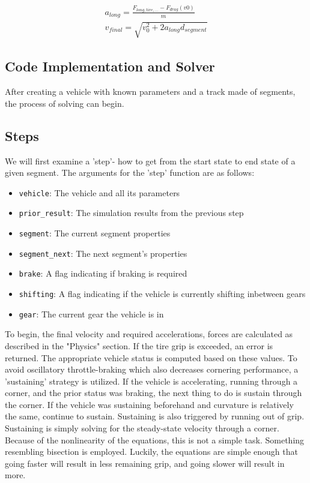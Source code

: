 \documentclass{article}
\begin{document}
\begin{align}
	a_{long} = \frac{F_{long,tire,...} - F_{drag}(v0)}{m} \\
	v_{final} = \sqrt{v_0^2 + 2 a_{long} d_{segment}}
\end{align}


\subsection{Code Implementation and Solver}

After creating a vehicle with known parameters and a track made of segments, the process of solving can begin. 

\subsection{Steps}

We will first examine a 'step'- how to get from the start state to end state of a given segment. The arguments for the 'step' function are as follows:

\begin{itemize}
\item \texttt{vehicle}: The vehicle and all its parameters
\item \texttt{prior\_result}: The simulation results from the previous step
\item \texttt{segment}: The current segment properties
\item \texttt{segment\_next}: The next segment's properties
\item \texttt{brake}: A flag indicating if braking is required
\item \texttt{shifting}: A flag indicating if the vehicle is currently shifting inbetween gears
\item \texttt{gear}: The current gear the vehicle is in
\end{itemize}

To begin, the final velocity and required accelerations, forces are calculated as described in the "Physics" section. If the tire grip is exceeded, an error is returned. The appropriate vehicle status is computed based on these values. To avoid oscillatory throttle-braking which also decreases cornering performance, a 'sustaining' strategy is utilized. If the vehicle is accelerating, running through a corner, and the prior status was braking, the next thing to do is sustain through the corner. If the vehicle was sustaining beforehand and curvature is relatively the same, continue to sustain. Sustaining is also triggered by running out of grip. Sustaining is simply solving for the steady-state velocity through a corner. Because of the nonlinearity of the equations, this is not a simple task. Something resembling bisection is employed. Luckily, the equations are simple enough that going faster will result in less remaining grip, and going slower will result in more.
\end{document}
